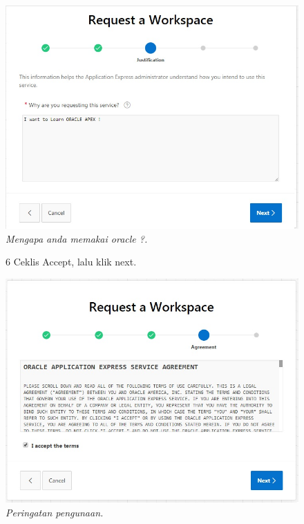 \begin{enumerate}
\begin{figure}
    \begin{center}
\includegraphics[scale=0.5]{figures/req3.jpg}
    \caption{\textit{Mengapa anda memakai oracle ?.}}
        \end{center}

\label{gambar}
\end{figure}

\begin{figure}
\item[6] Ceklis Accept, lalu klik next.

    \begin{center}
\includegraphics[scale=0.5]{figures/req4.jpg}
    \caption{\textit{Peringatan pengunaan.}}
        \end{center}


\end{figure}
\end{enumerate}

